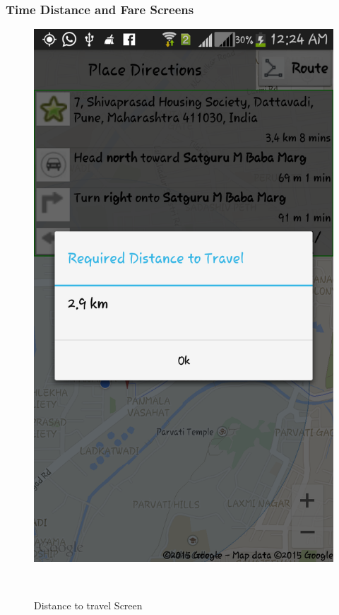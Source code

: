 \documentclass[12pt,a4paper]{article}
\begin{document}
\subsubsection{Time Distance and Fare Screens}
\begin{figure}[!htb]
\centering
\includegraphics[width=12 cm]{distance}
\caption{Distance to travel Screen}
\\

\end{figure}
\end{document}
